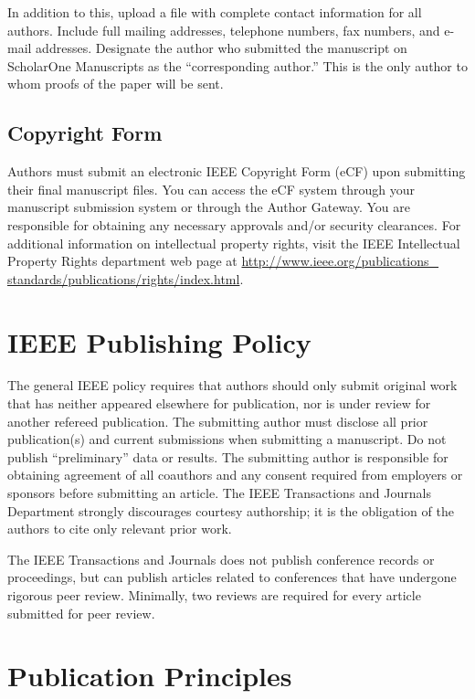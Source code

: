 \documentclass[journal]{IEEEtai}
\begin{document}
In addition to this, upload a file with complete contact information for all authors. Include full mailing addresses, telephone numbers, fax numbers, and e-mail addresses. Designate the author who submitted the manuscript on ScholarOne Manuscripts as the ``corresponding author.'' This is the only author to whom proofs of the paper will be sent. 

\subsection{Copyright Form}

Authors must submit an electronic IEEE Copyright Form (eCF) upon submitting their final manuscript files. You can access the eCF system through your manuscript submission system or through the Author Gateway. You are responsible for obtaining any necessary approvals and/or security clearances. For additional information on intellectual property rights, visit the IEEE Intellectual Property Rights department web page at \underline{http://www.ieee.org/publications\_} \underline{standards/publications/rights/index.html}. 

\section{IEEE Publishing Policy}

The general IEEE policy requires that authors should only submit original work that has neither appeared elsewhere for publication, nor is under review for another refereed publication. The submitting author must disclose all prior publication(s) and current submissions when submitting a manuscript. Do not publish ``preliminary'' data or results. The submitting author is responsible for obtaining agreement of all coauthors and any consent required from employers or sponsors before submitting an article. The IEEE Transactions and Journals Department strongly discourages courtesy authorship; it is the obligation of the authors to cite only relevant prior work.

The IEEE Transactions and Journals does not publish conference records or proceedings, but can publish articles related to conferences that have undergone rigorous peer review. Minimally, two reviews are required for every article submitted for peer review.

\section{Publication Principles}
\end{document}
